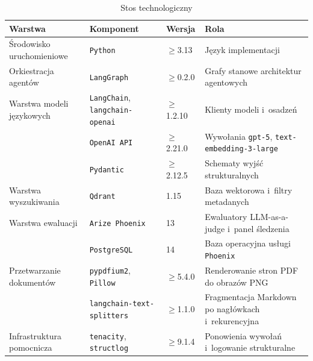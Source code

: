 \begin{table}[H]
  \caption{Stos technologiczny}\label{tab:stos-technologiczny}
  \centering
  \small
  \begin{tabularx}{\textwidth}{@{} l l l L @{}}
    \toprule
    \textbf{Warstwa}
    & \textbf{Komponent}
    & \textbf{Wersja}
    & \textbf{Rola}                                                              \\
    \midrule
    Środowisko uruchomieniowe
    & \texttt{Python}                                           & \(\geq\)3.13
    & Język implementacji                                                        \\
    \addlinespace
    Orkiestracja agentów
    & \texttt{LangGraph}                                        & \(\geq\)0.2.0
    & Grafy stanowe architektur agentowych                                       \\
    \addlinespace
    Warstwa modeli językowych
    & \texttt{LangChain}, \texttt{langchain-openai}             & \(\geq\)1.2.10
    & Klienty modeli i~osadzeń                                                   \\
    & \texttt{OpenAI API}                                       & \(\geq\)2.21.0
    & Wywołania \texttt{gpt-5}, \texttt{text-embedding-3-large}                  \\
    & \texttt{Pydantic}                                         & \(\geq\)2.12.5
    & Schematy wyjść strukturalnych                                              \\
    \addlinespace
    Warstwa wyszukiwania
    & \texttt{Qdrant}                                           & 1.15
    & Baza wektorowa i~filtry metadanych                                         \\
    \addlinespace
    Warstwa ewaluacji
    & \texttt{Arize Phoenix}                                    & 13
    & Ewaluatory LLM-as-a-judge i~panel śledzenia                                \\
    & \texttt{PostgreSQL}                                       & 14
    & Baza operacyjna usługi \texttt{Phoenix}                                    \\
    \addlinespace
    Przetwarzanie dokumentów
    & \texttt{pypdfium2}, \texttt{Pillow}                       & \(\geq\)5.4.0
    & Renderowanie stron PDF do obrazów PNG                                      \\
    & \texttt{langchain-text-splitters}                         & \(\geq\)1.1.0
    & Fragmentacja Markdown po nagłówkach i~rekurencyjna                         \\
    \addlinespace
    Infrastruktura pomocnicza
    & \texttt{tenacity}, \texttt{structlog}                     & \(\geq\)9.1.4
    & Ponowienia wywołań i~logowanie strukturalne                                \\
    \bottomrule
  \end{tabularx}
\end{table}


